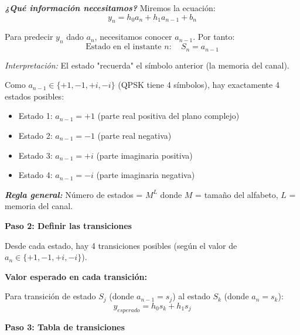 \documentclass[11pt,a4paper]{article}
\begin{document}
\textit{\textbf{¿Qu\'e informaci\'on necesitamos?}} Miremos la ecuaci\'on:
\[
y_n = h_0 a_n + h_1 a_{n-1} + b_n
\]

Para predecir $y_n$ dado $a_n$, necesitamos conocer $a_{n-1}$. Por tanto:
\[
\text{Estado en el instante } n: \quad S_n = a_{n-1}
\]

\textit{Interpretaci\'on:} El estado "recuerda" el s\'imbolo anterior (la memoria del canal).

Como $a_{n-1} \in \{+1, -1, +i, -i\}$ (QPSK tiene 4 s\'imbolos), hay exactamente 4 estados posibles:
\begin{itemize}
    \item Estado 1: $a_{n-1} = +1$ (parte real positiva del plano complejo)
    \item Estado 2: $a_{n-1} = -1$ (parte real negativa)
    \item Estado 3: $a_{n-1} = +i$ (parte imaginaria positiva)
    \item Estado 4: $a_{n-1} = -i$ (parte imaginaria negativa)
\end{itemize}

\textit{\textbf{Regla general:}} N\'umero de estados = $M^L$ donde $M$ = tama\~no del alfabeto, $L$ = memoria del canal.

\textbf{Paso 2: Definir las transiciones}

Desde cada estado, hay 4 transiciones posibles (seg\'un el valor de $a_n \in \{+1, -1, +i, -i\}$).

\textbf{Valor esperado en cada transici\'on:}

Para transici\'on de estado $S_j$ (donde $a_{n-1} = s_j$) al estado $S_k$ (donde $a_n = s_k$):
\[
y_{esperado} = h_0 s_k + h_1 s_j
\]

\textbf{Paso 3: Tabla de transiciones}
\end{document}
